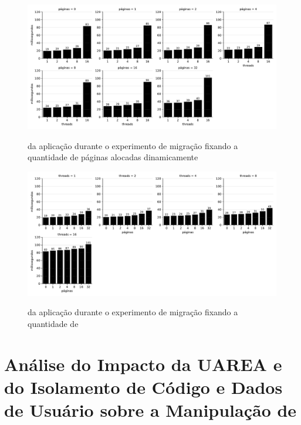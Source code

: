 \begin{figure}[tb]
    \centering
    \caption{\Downtime da aplicação durante o experimento de migração fixando a quantidade de páginas alocadas dinamicamente}
    \includegraphics[width=\linewidth]{content/images/multiple_threads_pages.pdf}
    \label{fig.mtpages}
\end{figure}

\begin{figure}[tb]
    \centering
    \caption{\Downtime da aplicação durante o experimento de migração fixando a quantidade de \threads}
    \includegraphics[width=\linewidth]{content/images/multiple_threads_threads.pdf}
    \label{fig.mtthreads}
\end{figure}

\section{Análise do Impacto da UAREA e do Isolamento de Código e Dados de Usuário sobre a Manipulação de \threads}

